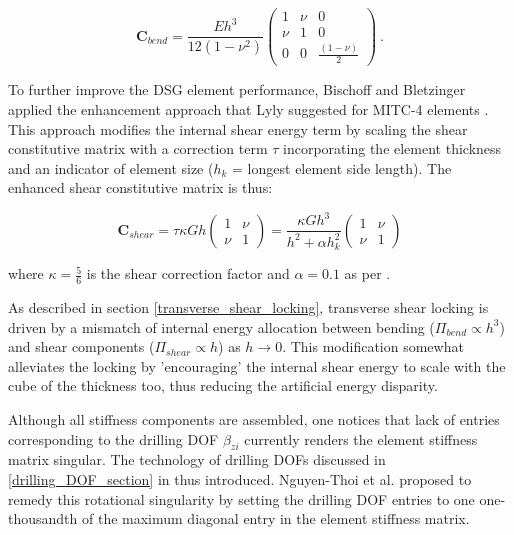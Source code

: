 \begin{equation} 
\mathbf{C}_{bend} =  \frac{E h^3}{12(1-\nu^2)}
\begin{pmatrix}
1 & \nu & 0 \\
\nu & 1 & 0 \\
0 & 0 & \frac{(1-\nu)}{2}
\end{pmatrix}
\label{eqt12}\ .
\end{equation}

To further improve the DSG element performance, Bischoff and Bletzinger \cite{Bis04} \cite{Bis01} applied the enhancement approach that Lyly suggested for MITC-4 elements \cite{Lyl93}. This approach modifies the internal shear energy term by scaling the shear constitutive matrix with a correction term $\tau$ incorporating the element thickness and an indicator of element size ($h_k$ = longest element side length). The enhanced  shear constitutive matrix is thus:

\begin{equation} 
\mathbf{C}_{shear} =  \tau \kappa Gh
\begin{pmatrix}
1 & \nu \\
\nu & 1 
\end{pmatrix}
=
\frac{\kappa G h^3}{h^2 + \alpha h_k^2}
\begin{pmatrix}
1 & \nu \\
\nu & 1 
\end{pmatrix}
\label{eqt14}
\end{equation}

where $\kappa = \frac{5}{6}$ is the shear correction factor and $\alpha = 0.1$ as per \cite{Lyl93}.

As described in section \ref{transverse_shear_locking}, transverse shear locking is driven by a mismatch of internal energy allocation between bending ($\Pi_{bend} \propto h^3$) and shear components ($\Pi_{shear} \propto h$) as $h \rightarrow 0$.  This modification somewhat alleviates the locking by 'encouraging' the internal shear energy to scale with the cube of the thickness too, thus reducing the artificial energy disparity.

Although all stiffness components are assembled, one notices that lack of entries corresponding to the drilling DOF $\beta_{zi}$ currently renders the element stiffness matrix singular. The technology of drilling DOFs discussed in \ref{drilling_DOF_section} in thus introduced. Nguyen-Thoi et al. \cite{Ngu13} proposed to remedy this rotational singularity by setting the drilling DOF entries to one one-thousandth of the maximum diagonal entry in the element stiffness matrix.

